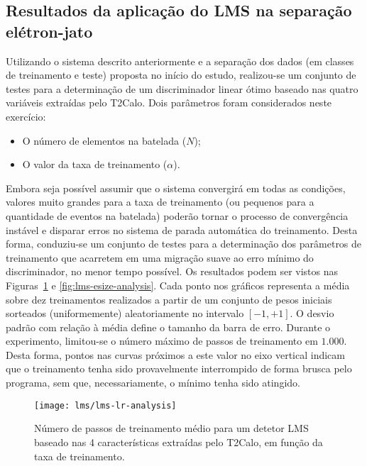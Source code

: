 \subsection{Resultados da aplicação do LMS na separação e\-lé\-tron-jato}

Utilizando o sistema descrito anteriormente e a separação dos dados (em
classes de treinamento e teste) proposta no início do estudo, realizou-se um
conjunto de testes para a determinação de um discriminador linear ótimo
baseado nas quatro variáveis extraídas pelo T2Calo. Dois parâmetros foram
considerados neste exercício:

\begin{itemize}
\item O número de elementos na batelada ($N$);
\item O valor da taxa de treinamento ($\alpha$).
\end{itemize}

Embora seja possível assumir que o sistema convergirá em todas as condições,
valores muito grandes para a taxa de treinamento (ou pequenos para a
quantidade de eventos na batelada) poderão tornar o processo de convergência
instável e disparar erros no sistema de parada automática do
treinamento. Desta forma, conduziu-se um conjunto de testes para a
determinação dos parâmetros de treinamento que acarretem em uma migração suave
ao erro mínimo do discriminador, no menor tempo possível. Os resultados podem
ser vistos nas Figuras~\ref{fig:lms-lr-analysis} e
\ref{fig:lms-esize-analysis}. Cada ponto nos gráficos representa a média sobre
dez treinamentos realizados a partir de um conjunto de pesos iniciais
sorteados (uniformemente) aleatoriamente no intervalo $[-1, +1]$. O desvio
padrão com relação à média define o tamanho da barra de erro. Durante o
experimento, limitou-se o número máximo de passos de treinamento em
$1.000$. Desta forma, pontos nas curvas próximos a este valor no eixo vertical
indicam que o treinamento tenha sido provavelmente interrompido de forma
brusca pelo programa, sem que, necessariamente, o mínimo tenha sido atingido.

\begin{figure}
\begin{center}
\texttt{[image: lms/lms-lr-analysis]}
\end{center}
\caption{Número de passos de treinamento médio para um detetor LMS baseado nas
4 características extraídas pelo T2Calo, em função da taxa de treinamento.}
\label{fig:lms-lr-analysis}
\end{figure}

